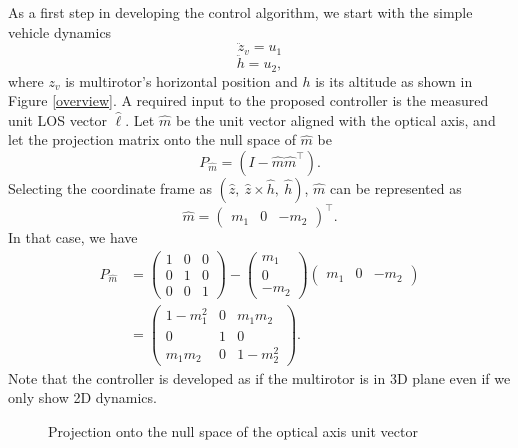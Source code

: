 As a first step in developing the control algorithm, we start with the simple vehicle dynamics  
\begin{equation}
\ddot{z}_v=u_1
\end{equation}
\begin{equation}
\ddot{h}=u_2,
\end{equation} 
where $z_v$ is multirotor's horizontal position and $h$ is its altitude as shown in Figure \ref{overview}.
A required input to the proposed controller is the measured unit LOS vector $\hat{\ell}$. 
Let $\hat{m}$ be the unit vector aligned with the optical axis, and let the projection matrix onto the null space of $\hat{m}$ be 
\begin{equation}
P_{\hat{m}}=(I-\hat{m}\hat{m}^\top).
\end{equation}
Selecting the coordinate frame as $(\hat{z},\ \hat{z}\times\hat{h},\ \hat{h})$, $\hat{m}$ can be represented as 
\begin{equation}
\hat{m}=\begin{pmatrix}
m_1 & 0 & -m_2
\end{pmatrix}^\top.
\end{equation}
In that case, we have 
\begin{align}
P_{\hat{m}}&=\begin{pmatrix}1 & 0 & 0 \\ 0 & 1 & 0 \\ 0 & 0 & 1 \end{pmatrix}
-\begin{pmatrix} m_1 \\ 0 \\ -m_2 \end{pmatrix}\begin{pmatrix} m_1 & 0 & -m_2 \end{pmatrix}
\\&=\begin{pmatrix}1-m_1^2 & 0 & m_1m_2 \\ 0 & 1 & 0 \\ m_1m_2 & 0 & 1-m_2^2 \end{pmatrix}.
\label{p_mhat}
\end{align}
Note that the controller is developed as if the multirotor is in 3D plane even if we only show 2D dynamics.
\begin{figure}[htbp]
	\centering
	\caption{Projection onto the null space of the optical axis unit vector}
	\label{projection}
\end{figure}

